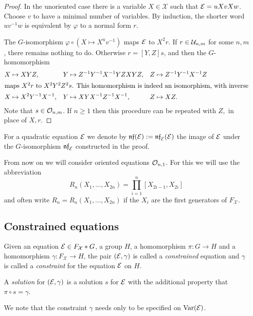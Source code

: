 \documentclass[a4paper,11pt]{amsart}
\begin{document}
\begin{proof}
  In the unoriented case there is a variable $X\in\mathcal{X}$ such that
  $\mathcal{E} = uXvXw$. Choose $v$ to have a minimal number of variables.
  By induction, the shorter word
  $uv^{-1}w$ is equivalent by $\varphi$ to a normal form $r$.
 
  The $G$-isomorphism $\varphi \circ (X\mapsto X^uv^{-1})$ maps $\mathcal{E}$ to
  $X^2r$. If $r\in \mathcal{U}_{n,m}$ for some $n,m$,
  there remains nothing to do.  Otherwise $r=[Y,Z]s$, and then the
  $G$-homomorphism
  \begin{align*}
    X&\mapsto XYZ, & Y&\mapsto Z^{-1}Y^{-1}X^{-1}YZXYZ, & Z&\mapsto Z^{-1}Y^{-1}X^{-1}Z \\
  \intertext{maps $X^2r$ to $X^2Y^2Z^2s$. This homomorphism is indeed an
  isomorphism, with inverse}
    X&\mapsto X^2Y^{-1}X^{-1}, & Y&\mapsto XYX^{-1}Z^{-1}X^{-1}, & Z&\mapsto XZ.
  \end{align*}
  Note that $s \in \mathcal{O}_{n,m}$. If $n\geq 1$ then this procedure can be repeated with
  $Z,$ in place of $X,r$.
\end{proof}
For a quadratic equation $\mathcal{E}$ we denote by $\mathfrak{nf}(\mathcal{E}) := \mathfrak{nf}_{\mathcal{E}}(\mathcal{E})$
the image of $\mathcal{E}$ under the $G$-isomorphism $\mathfrak{nf}_{\mathcal{E}}$ constructed in
the proof.

From now on we will consider oriented equations $\mathcal{O}_{n,1}$. For this
we will use the abbreviation
\[R_n(X_1,\dotsc,X_{2n})=\prod_{i=1}^n [X_{2i-1},X_{2i}]\]
and often write $R_n=R_n(X_1,\dotsc,X_{2n})$ if the $X_i$ are the
first generators of $F_{\mathcal{X}}$.

\subsection{Constrained equations}
\begin{defi}
  Given an equation $\mathcal{E} \in F_{\mathcal{X}}*G$, a group $H$, a
  homomorphism $\pi\colon G \to H$ and a homomorphism
  $\gamma\colon F_{\mathcal{X}} \to H$, the pair $(\mathcal{E},\gamma)$ is
  called a \emph{constrained} equation and $\gamma$ is called a
  \emph{constraint} for the equation $\mathcal{E}$ on $H$.
 
  A \emph{solution} for $(\mathcal{E},\gamma)$ is a solution $s$ for
  $\mathcal{E}$ with the additional property that $\pi\circ s=\gamma$.
\end{defi}
We note that the constraint $\gamma$ needs only to be specified on $\textup{Var}(\mathcal{E})$.

\end{document}
